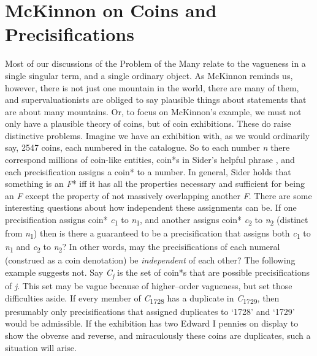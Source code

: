 \section{McKinnon on Coins and Precisifications}

Most of our discussions of the Problem of the Many relate to the vagueness in a single singular term, and a single ordinary object. As McKinnon reminds us, however, there is not just one mountain in the world, there are many of them, and supervaluationists are obliged to say plausible things about statements that are about many mountains. Or, to focus on McKinnon's example, we must not only have a plausible theory of coins, but of coin exhibitions. These do raise distinctive problems. Imagine we have an exhibition with, as we would ordinarily say, 2547 coins, each numbered in the catalogue. So to each number \textit{n} there correspond millions of coin-like entities, coin*s in Sider's helpful phrase \citep{Sider2001}, and each precisification assigns a coin* to a number. In general, Sider holds that something is an \textit{F}* iff it has all the properties necessary and sufficient for being an \textit{F }except the property of not massively overlapping another \textit{F}. There are some interesting questions about how independent these assignments can be. If one precisification assigns coin* \textit{c}\textsubscript{1} to \textit{n}\textsubscript{1}, and another assigns coin* \textit{c}\textsubscript{2} to \textit{n}\textsubscript{2} (distinct from \textit{n}\textsubscript{1}) then is there a guaranteed to be a precisification that assigns both \textit{c}\textsubscript{1} to \textit{n}\textsubscript{1} and \textit{c}\textsubscript{2} to \textit{n}\textsubscript{2}? In other words, may the precisifications of each numeral (construed as a coin denotation) be \textit{independent} of each other? The following example suggests not. Say \textit{C}\textit{\textsubscript{j}} is the set of coin*s that are possible precisifications of \textit{j}. This set may be vague because of higher--order vagueness, but set those difficulties aside. If every member of \textit{C}\textsubscript{1728} has a duplicate in \textit{C}\textsubscript{1729}, then presumably only precisifications that assigned duplicates to `1728' and `1729' would be admissible. If the exhibition has two Edward I pennies on display to show the obverse and reverse, and miraculously these coins are duplicates, such a situation will arise.

